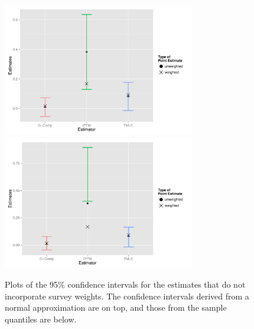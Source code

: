 \documentclass{article}
\begin{document}
\begin{figure}
\centering
\includegraphics[width=0.75\textwidth]{figures/naiveBootstrapNormalCI.pdf}
\includegraphics[width=0.75\textwidth]{figures/naiveBootstrapQuantileCI.pdf}
\caption{Plots of the 95\% confidence intervals for the estimates that do not incorporate survey weights. The confidence intervals derived from a normal approximation are on top, and those from the sample quantiles are below.}
\label{fig:cis}
\end{figure}
\end{document}
